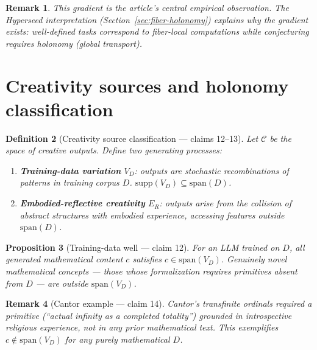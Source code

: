 \documentclass[11pt,a4paper]{article}
\newtheorem{definition}{Definition}[section]
\newtheorem{proposition}[definition]{Proposition}
\newtheorem{remark}[definition]{Remark}
\begin{document}
\begin{remark}
This gradient is the article's central empirical observation. The Hyperseed
interpretation (Section~\ref{sec:fiber-holonomy}) explains \emph{why} the
gradient exists: well-defined tasks correspond to fiber-local computations
while conjecturing requires holonomy (global transport).
\end{remark}

\section{Creativity sources and holonomy classification}
\label{sec:creativity}

\begin{definition}[Creativity source classification --- claims 12--13]
\label{def:creativity}
Let $\mathcal{C}$ be the space of creative outputs. Define two
generating processes:
\begin{enumerate}
\item \textbf{Training-data variation} $V_D$: outputs are stochastic
  recombinations of patterns in training corpus $D$.
  $\text{supp}(V_D) \subseteq \text{span}(D)$.
\item \textbf{Embodied-reflective creativity} $E_R$: outputs arise from
  the collision of abstract structures with embodied experience, accessing
  features outside $\text{span}(D)$.
\end{enumerate}
\end{definition}

\begin{proposition}[Training-data well --- claim 12]
\label{prop:training-well}
For an LLM trained on $D$, all generated mathematical content $c$ satisfies
$c \in \text{span}(V_D)$. Genuinely novel mathematical concepts ---
those whose formalization requires primitives absent from $D$ ---
are outside $\text{span}(V_D)$.
\end{proposition}

\begin{remark}[Cantor example --- claim 14]
Cantor's transfinite ordinals required a primitive (``actual infinity as
a completed totality'') grounded in introspective religious experience,
not in any prior mathematical text. This exemplifies
$c \notin \text{span}(V_D)$ for any purely mathematical $D$.
\end{remark}
\end{document}
